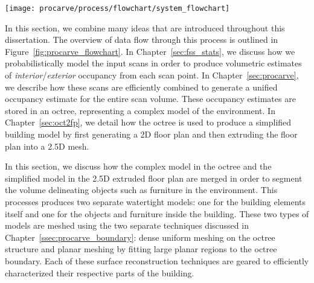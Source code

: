 \documentclass[12pt,onecolumn,oneside]{book}
\begin{document}
\begin{figure*}[t]
	\centerline{\texttt{[image: procarve/process/flowchart/system\_flowchart]}}
	\caption[System flowchart of our approach.]{System flowchart of our approach.  Scan Preprocessing is described in Chapter~\ref{sec:fss_stats}, Carving is detailed in Chapter~\ref{sec:procarve}, Wall Sampling and Floor Plan Generation are discussed in Chapter~\ref{sec:oct2fp}, Merge Models is delineated in Chapter~\ref{ssec:procarve_fp_alignment}, and Planar and Detailed Meshing are documented in Chapter~\ref{ssec:procarve_boundary}.}
	\label{fig:procarve_flowchart}
\end{figure*}

In this section, we combine many ideas that are introduced throughout this dissertation.  The overview of data flow through this process is outlined in Figure~\ref{fig:procarve_flowchart}.  In Chapter~\ref{sec:fss_stats}, we discuss how we probabilistically model the input scans in order to produce volumetric estimates of {\it interior}/{\it exterior} occupancy from each scan point.  In Chapter~\ref{sec:procarve}, we describe how these scans are efficiently combined to generate a unified occupancy estimate for the entire scan volume.  These occupancy estimates are stored in an octree, representing a complex model of the environment.  In Chapter~\ref{sec:oct2fp}, we detail how the octree is used to produce a simplified building model by first generating a 2D floor plan and then extruding the floor plan into a 2.5D mesh.  

In this section, we discuss how the complex model in the octree and the simplified model in the 2.5D extruded floor plan are merged in order to segment the volume delineating objects such as furniture in the environment.  This processes produces two separate watertight models:  one for the building elements itself and one for the objects and furniture inside the building.  These two types of models are meshed using the two separate techniques discussed in Chapter~\ref{ssec:procarve_boundary}:  dense uniform meshing on the octree structure and planar meshing by fitting large planar regions to the octree boundary.  Each of these surface reconstruction techniques are geared to efficiently characterized their respective parts of the building.
\end{document}
